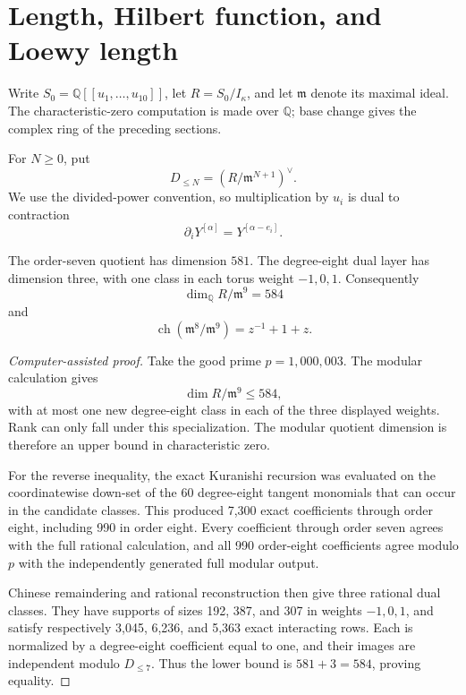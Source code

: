 \documentclass[11pt,reqno]{amsart}
\begin{document}
\section{Length, Hilbert function, and Loewy length}
\label{sec:length}

Write \(S_0=\mathbb Q[[u_1,\ldots,u_{10}]]\), let
\(R=S_0/I_\kappa\), and let \(\mathfrak m\) denote its maximal ideal.  The
characteristic-zero computation is made over \(\mathbb Q\); base change gives
the complex ring of the preceding sections.

For \(N\ge0\), put
\[
D_{\le N}=
\left(R/\mathfrak m^{N+1}\right)^\vee.
\]
We use the divided-power convention, so multiplication by \(u_i\) is dual to
contraction
\[
\partial_iY^{[\alpha]}=Y^{[\alpha-e_i]}.
\]

\begin{proposition}
\label{prop:terminal}
The order-seven quotient has dimension \(581\).  The degree-eight dual layer
has dimension three, with one class in each torus weight \(-1,0,1\).
Consequently
\[
\dim_\mathbb Q R/\mathfrak m^9=584
\]
and
\[
\operatorname{ch}(\mathfrak m^8/\mathfrak m^9)=z^{-1}+1+z.
\]
\end{proposition}

\begin{proof}[Computer-assisted proof]
Take the good prime \(p=1{,}000{,}003\).  The modular calculation gives
\[
\dim R/\mathfrak m^9\le584,
\]
with at most one new degree-eight class in each of the three displayed
weights.  Rank can only fall under this specialization.  The modular quotient
dimension is therefore an upper bound in characteristic zero.

For the reverse inequality, the exact Kuranishi recursion was evaluated on
the coordinatewise down-set of the 60 degree-eight tangent monomials that can
occur in the candidate classes.  This produced 7,300 exact coefficients
through order eight, including 990 in order eight.  Every coefficient through
order seven agrees with the full rational calculation, and all 990
order-eight coefficients agree modulo \(p\) with the independently generated
full modular output.

Chinese remaindering and rational reconstruction then give three rational
dual classes.  They have supports of sizes 192, 387, and 307 in weights
\(-1,0,1\), and satisfy respectively 3,045, 6,236, and 5,363 exact
interacting rows.  Each is normalized by a degree-eight coefficient equal to
one, and their images are independent modulo \(D_{\le7}\).  Thus the lower
bound is \(581+3=584\), proving equality.
\end{proof}
\end{document}
